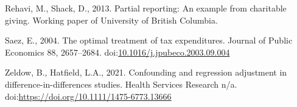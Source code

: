 \documentclass[
  11pt,
  a4paper,
]{article}
\newlength{\cslhangindent}
\newlength{\cslentryspacingunit} %
\newenvironment{CSLReferences}[2] %
 {%
  \setlength{\parindent}{0pt}
  \ifodd #1
  \let\oldpar\par
  \def\par{\hangindent=\cslhangindent\oldpar}
  \fi
  \setlength{\parskip}{#2\cslentryspacingunit}
 }%
 {}
\begin{document}
\begin{CSLReferences}{1}{0}
\leavevmode{}%
Rehavi, M., Shack, D., 2013. Partial reporting: An example from charitable giving. Working paper of University of British Columbia.

\leavevmode{}%
Saez, E., 2004. The optimal treatment of tax expenditures. Journal of Public Economics 88, 2657--2684. doi:\href{https://doi.org/10.1016/j.jpubeco.2003.09.004}{10.1016/j.jpubeco.2003.09.004}

\leavevmode{}%
Zeldow, B., Hatfield, L.A., 2021. Confounding and regression adjustment in difference-in-differences studies. Health Services Research n/a. doi:\url{https://doi.org/10.1111/1475-6773.13666}

\end{CSLReferences}
\end{document}

